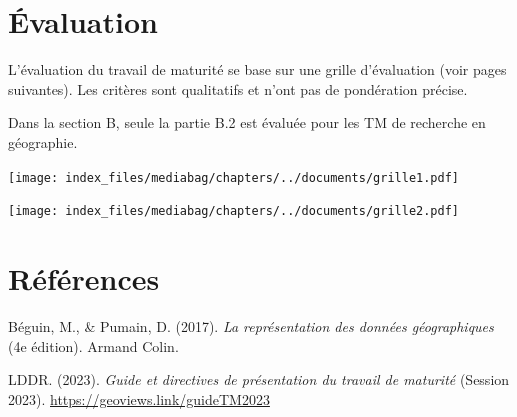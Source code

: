 \documentclass[
  a4paper,
]{book}
\newlength{\cslhangindent}
\newlength{\cslentryspacingunit} %
\newenvironment{CSLReferences}[2] %
 {%
  \setlength{\parindent}{0pt}
  \ifodd #1
  \let\oldpar\par
  \def\par{\hangindent=\cslhangindent\oldpar}
  \fi
  \setlength{\parskip}{#2\cslentryspacingunit}
 }%
 {}
\begin{document}
\hypertarget{uxe9valuation}{%
\chapter{Évaluation}\label{uxe9valuation}}

L'évaluation du travail de maturité se base sur une grille d'évaluation
(voir pages suivantes). Les critères sont qualitatifs et n'ont pas de
pondération précise.

Dans la section B, seule la partie B.2 est évaluée pour les TM de
recherche en géographie.

\newpage{}

\texttt{[image: index\_files/mediabag/chapters/../documents/grille1.pdf]}

\newpage{}

\texttt{[image: index\_files/mediabag/chapters/../documents/grille2.pdf]}

\hypertarget{ruxe9fuxe9rences}{%
\chapter*{Références}\label{ruxe9fuxe9rences}}


\hypertarget{refs}{}
\begin{CSLReferences}{1}{0}
\leavevmode{}%
Béguin, M., \& Pumain, D. (2017). \emph{La représentation des données
géographiques} (4e édition). Armand Colin.

\leavevmode{}%
LDDR. (2023). \emph{Guide et directives de présentation du travail de
maturité} (Session 2023). \url{https://geoviews.link/guideTM2023}

\end{CSLReferences}


\backmatter
\end{document}
